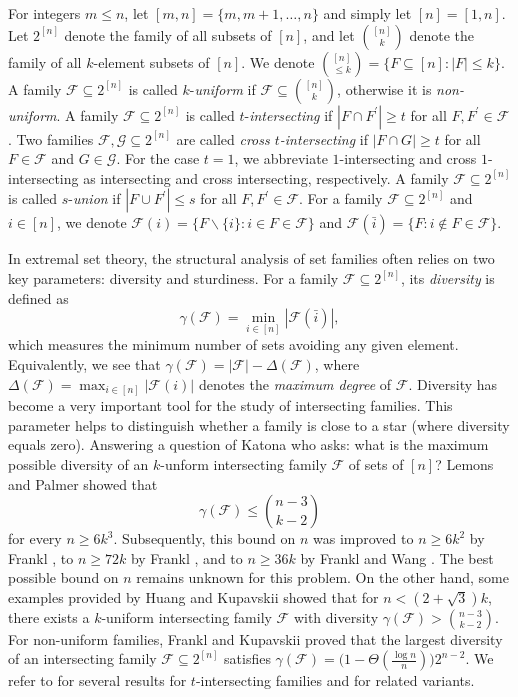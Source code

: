\documentclass[11pt]{article}
\begin{document}
 For integers $m\leq n$, let  $[m, n]=\{m, m+1, \ldots, n\}$ and simply let $[n]=[1,n]$. Let $2^{[n]}$ denote the family of all subsets of $[n]$, and let  $\binom{[n]}{k}$ denote the family of all $k$-element subsets of $[n]$.  
 We denote $\binom{[n]}{\leq k}=\{F\subseteq [n]: |F|\leq k\}$. A family $\mathcal{F}\subseteq 2^{[n]}$  is called $k$-\textit{uniform} if $\mathcal{F}\subseteq\binom{[n]}{k}$, otherwise it is \textit{non-uniform}. 
 A family $\mathcal{F} \subseteq 2^{[n]}$ is called $t$-\textit{intersecting} if $|F\cap F^{\prime}|\geq  t$
 for all $F, F^{\prime}\in \mathcal{F}$. 
Two families $ \mathcal{F}, \mathcal{G} \subseteq 2^{[n]} $ are called  \textit{cross $t$-intersecting} if $|F\cap G|\geq  t$
 for all $F\in \mathcal{F}$ and $G\in \mathcal{G}$.
For the case $t=1$, we abbreviate $1$-intersecting and cross $1$-intersecting as intersecting and cross intersecting, respectively.
A family $\mathcal{F} \subseteq 2^{[n]}$ is called $s$-\textit{union} if $|F\cup F^{\prime}|\leq  s$
 for all $F, F^{\prime}\in \mathcal{F}$. 
For a family $\mathcal{F}\subseteq 2^{[n]}$ and $i\in [n]$, we denote 
$\mathcal{F} (i)=\{F\backslash\{i\}: i\in F\in \mathcal{F}\}$ and  $\mathcal{F} (\bar{i})=\{F: i\notin F\in \mathcal{F}\}$. 



In extremal set theory, the structural analysis of set families often relies on two key parameters: diversity and sturdiness. For a family $\mathcal{F} \subseteq 2^{[n]}$, its \textit{diversity} is defined as 
\[ \gamma(\mathcal{F}) = \min_{i \in [n]} |\mathcal{F}(\bar{i})|, \] 
which measures the minimum number of sets avoiding any given element. Equivalently, we see that $\gamma (\mathcal{F})=|\mathcal{F}|-\Delta(\mathcal{F})$, where $ \Delta(\mathcal{F})=\max_{i \in [n]} |\mathcal{F}(i)|$ denotes the \textit{maximum degree} of 
$\mathcal{F}$. 
Diversity has become a very important tool for the study of intersecting families. This parameter helps to distinguish whether a family is close to a star (where diversity equals zero). 
Answering a question of Katona who asks: what is the maximum possible diversity of an $k$-unform intersecting family $\mathcal{F}$ of sets of $[n]$? Lemons and Palmer \cite{LP2008} 
showed that 
\[ \gamma (\mathcal{F}) \le {n-3 \choose k-2} \] 
for every $n\ge 6k^3$. Subsequently, 
this bound on $n$  was improved to $n\ge 6k^2$ by Frankl \cite{F17}, to $n\ge 72k$ by Frankl \cite{F20}, and to $n\ge 36k$ by Frankl and Wang \cite{FW2024}. The best possible bound on $n$ remains unknown for this problem. 
On the other hand, some examples provided by Huang \cite{Huang2019} and Kupavskii \cite{Kup2018} showed that for $n< (2+ \sqrt{3})k$, there exists a $k$-uniform  intersecting family $\mathcal{F}$ with diversity $\gamma (\mathcal{F}) > {n-3 \choose k-2}$. 
For non-uniform families, Frankl and Kupavskii \cite{FK2021} proved that the largest diversity of an intersecting family $\mathcal{F}\subseteq 2^{[n]}$ satisfies $\gamma (\mathcal{F}) = \big(1- \Theta (\frac{\log n}{n}) \big) 2^{n-2}$.  
We refer to \cite{FK2021} for several results for $t$-intersecting families and \cite{FW2022, FW2025, Pat2025} for related variants. 
\end{document}
